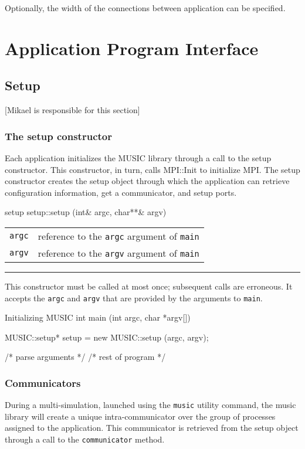 \documentclass[a4paper]{report}
\makeatletter
\newenvironment{parameters}%
{\begin{tabular}{@{\hspace{2em}}lp{0.6\textwidth}}}%
{\end{tabular}\par\vspace{1mm}\par\hrule\par\vspace{5mm}}
\newcommand{\responsible}[1]%
{{\color{red}[#1 is responsible for this section]}}
\makeatother
\begin{document}
Optionally, the width of the connections between application can be
specified.


\chapter{Application Program Interface}

\section{Setup}
\responsible{Mikael}

\subsection{The setup constructor}

Each application initializes the MUSIC library through a call to the
setup constructor.  This constructor, in turn, calls MPI::Init to
initialize MPI.  The setup constructor creates the setup object
through which the application can retrieve configuration information,
get a communicator, and setup ports.

\begin{head}{setup}
  setup::setup (int& argc, char**& argv)
\end{head}
\begin{parameters}
  \lstinline|argc| &%
  reference to the \lstinline|argc| argument of \lstinline|main| \\
  \lstinline|argv| &%
  reference to the \lstinline|argv| argument of \lstinline|main| \\
\end{parameters}

This constructor must be called at most once; subsequent calls are
erroneous.  It accepts the \lstinline|argc| and \lstinline|argv| that are
provided by the arguments to \lstinline|main|.

\begin{code}{Initializing MUSIC}
int main (int argc, char *argv[])
{
  MUSIC::setup* setup = new MUSIC::setup (argc, argv);

  /* parse arguments */
  /* rest of program */
}
\end{code}

\subsection{Communicators}

During a multi-simulation, launched using the \lstinline|music| utility
command, the music library will create a unique intra-communicator
over the group of processes assigned to the application.  This
communicator is retrieved from the setup object through a call to the
\lstinline|communicator| method.
\end{document}
